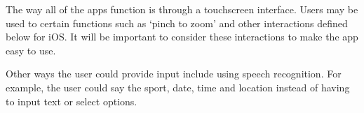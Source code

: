 The way all of the apps function is through a touchscreen interface. Users may
be used to certain functions such as `pinch to zoom' and other interactions
defined below for iOS\@. It will be important to consider these interactions to
make the app easy to use.

Other ways the user could provide input include using speech recognition. For
example, the user could say the sport, date, time and location instead of
having to input text or select options.

